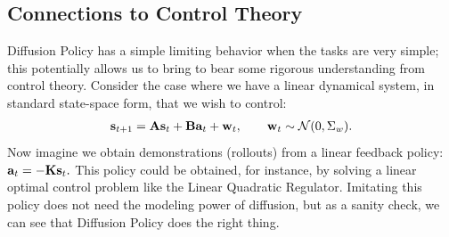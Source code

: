 \documentclass[Afour,sageh,times]{sagej}
\begin{document}


\subsection{Connections to Control Theory}
\label{sec:control}
Diffusion Policy has a simple limiting behavior when the tasks are very simple; this potentially allows us to bring to bear some rigorous understanding from control theory. Consider the case where we have a linear dynamical system, in standard state-space form, that we wish to control:
\begin{gather*} 
{\bf s}_{t+1} = {\bf A}{\bf s}_t + {\bf B}{\bf a}_t + {\bf w}_t, \qquad {\bf w}_t \sim \mathcal{N}(0, \Sigma_w).
\end{gather*} Now imagine we obtain demonstrations (rollouts) from a linear feedback policy: ${\bf a}_t = -{\bf K}{\bf s}_t.$ This policy could be obtained, for instance, by solving a linear optimal control problem like the Linear Quadratic Regulator. Imitating this policy does not need the modeling power of diffusion, but as a sanity check, we can see that Diffusion Policy does the right thing.
\end{document}
